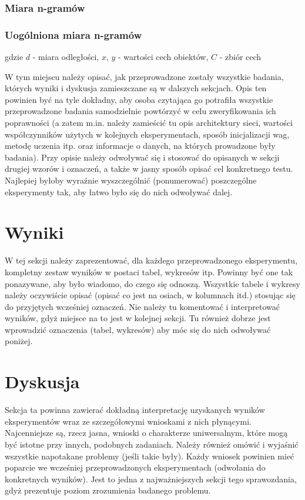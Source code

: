 \documentclass{classrep}
\begin{document}
\subsubsection{Miara n-gramów}
\subsubsection{Uogólniona miara n-gramów}

gdzie $d$ - miara odległości, $x$, $y$ - wartości cech obiektów, $C$ - zbiór cech

{\color{blue}
W tym miejscu należy opisać, jak przeprowadzone zostały wszystkie badania,
których wyniki i dyskusja zamieszczane są w dalszych sekcjach. Opis ten
powinien być na tyle dokładny, aby osoba czytająca go potrafiła wszystkie
przeprowadzone badania samodzielnie powtórzyć w celu zweryfikowania ich
poprawności (a zatem m.in. należy zamieścić tu opis architektury sieci,
wartości współczynników użytych w kolejnych eksperymentach, sposób
inicjalizacji wag, metodę uczenia itp. oraz informacje o danych, na których
prowadzone były badania). Przy opisie należy odwoływać się i stosować do
opisanych w sekcji drugiej wzorów i oznaczeń, a także w jasny sposób opisać
cel konkretnego testu. Najlepiej byłoby wyraźnie wyszczególnić (ponumerować)
poszczególne eksperymenty tak, aby łatwo było się do nich odwoływać dalej.}

\section{Wyniki}
{\color{blue}
W tej sekcji należy zaprezentować, dla każdego przeprowadzonego eksperymentu,
kompletny zestaw wyników w postaci tabel, wykresów itp. Powinny być one tak
ponazywane, aby było wiadomo, do czego się odnoszą. Wszystkie tabele i wykresy
należy oczywiście opisać (opisać co jest na osiach, w kolumnach itd.) stosując
się do przyjętych wcześniej oznaczeń. Nie należy tu komentować i interpretować
wyników, gdyż miejsce na to jest w kolejnej sekcji. Tu również dobrze jest
wprowadzić oznaczenia (tabel, wykresów) aby móc się do nich odwoływać
poniżej.}

\section{Dyskusja}
{\color{blue}
Sekcja ta powinna zawierać dokładną interpretację uzyskanych wyników
eksperymentów wraz ze szczegółowymi wnioskami z nich płynącymi. Najcenniejsze
są, rzecz jasna, wnioski o charakterze uniwersalnym, które mogą być istotne
przy innych, podobnych zadaniach. Należy również omówić i wyjaśnić wszystkie
napotakane problemy (jeśli takie były). Każdy wniosek powinien mieć poparcie
we wcześniej przeprowadzonych eksperymentach (odwołania do konkretnych
wyników). Jest to jedna z najważniejszych sekcji tego sprawozdania, gdyż
prezentuje poziom zrozumienia badanego problemu.}
\end{document}
